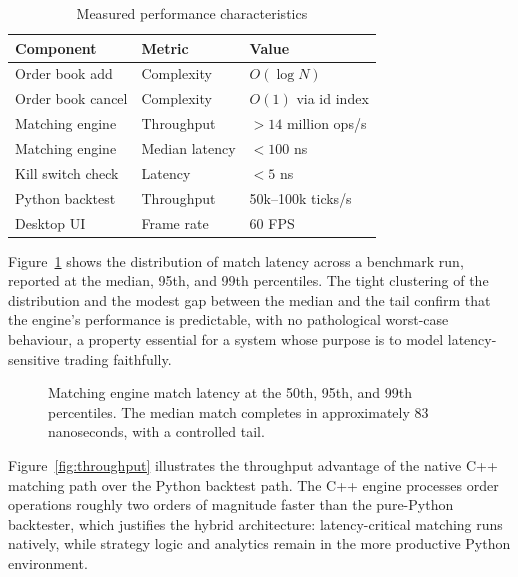 \documentclass[12pt,oneside,a4paper]{report}
\begin{document}
\begin{table}[H]
\centering
\caption{Measured performance characteristics}
\label{tab:perf}
\small
\begin{tabular}{p{1.6in}p{1.6in}p{1.8in}}
\toprule
\textbf{Component} & \textbf{Metric} & \textbf{Value} \\
\midrule
Order book add & Complexity & $O(\log N)$ \\
Order book cancel & Complexity & $O(1)$ via id index \\
Matching engine & Throughput & $> 14$ million ops/s \\
Matching engine & Median latency & $< 100$ ns \\
Kill switch check & Latency & $< 5$ ns \\
Python backtest & Throughput & 50k--100k ticks/s \\
Desktop UI & Frame rate & 60 FPS \\
\bottomrule
\end{tabular}
\end{table}

Figure~\ref{fig:latency} shows the distribution of match latency across a benchmark run, reported at the median, 95th, and 99th percentiles. The tight clustering of the distribution and the modest gap between the median and the tail confirm that the engine's performance is predictable, with no pathological worst-case behaviour, a property essential for a system whose purpose is to model latency-sensitive trading faithfully.

\begin{figure}[H]
\centering
{}
\caption[Matching engine match latency percentiles]{Matching engine match latency at the 50th, 95th, and 99th percentiles. The median match completes in approximately 83 nanoseconds, with a controlled tail.}
\label{fig:latency}
\end{figure}

Figure~\ref{fig:throughput} illustrates the throughput advantage of the native C++ matching path over the Python backtest path. The C++ engine processes order operations roughly two orders of magnitude faster than the pure-Python backtester, which justifies the hybrid architecture: latency-critical matching runs natively, while strategy logic and analytics remain in the more productive Python environment.
\end{document}
